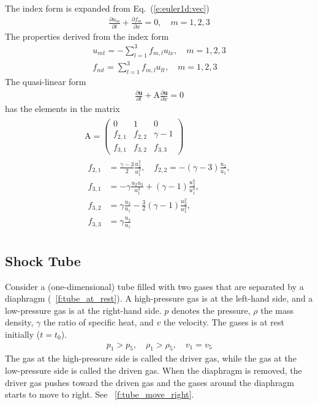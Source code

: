 \documentclass{turgon}
\begin{document}
The index form is expanded from Eq.~(\ref{e:euler1d:vec})
%
\begin{align}
  \frac{\partial u_m}{\partial t} + \frac{\partial f_m}{\partial x}
  = 0, \quad m = 1, 2, 3
  \label{e:euler1:idx}
\end{align}
%
The properties derived from the index form
%
\begin{gather}
  u_{mt} = -\sum_{l=1}^3 f_{m,l} u_{lx},  \quad m = 1, 2, 3
  \label{e:euler1:ut}
  \\
  f_{mt} = \sum_{l=1}^3 f_{m,l} u_{lt},  \quad m = 1, 2, 3
  \label{e:euler1:ft}
\end{gather}
%
The quasi-linear form
%
\begin{align}
  \frac{\partial\mathbf{u}}{\partial t}
  + \mathrm{A} \frac{\partial\mathbf{u}}{\partial x} = 0
  \label{e:euler1d:qlinear}
\end{align}
%
has the elements in the matrix
%
\begin{gather}
  \begin{gathered}
    \mathrm{A} = \left(
    \begin{array}{ccc}
      0       & 1       & 0          \\
      f_{2,1} & f_{2,2} & \gamma - 1 \\
      f_{3,1} & f_{3,2} & f_{3,3}
    \end{array}
    \right)
    \\
    \begin{aligned}
      f_{2,1} &= \frac{\gamma-3}{2}\frac{u_2^2}{u_1^2}, \quad
      f_{2,2} = -(\gamma-3)\frac{u_2}{u_1}, \\
      f_{3,1} &= -\gamma\frac{u_2 u_3}{u_1^2}
      + (\gamma-1)\frac{u_2^3}{u_1^3}, \\
      f_{3,2} &= \gamma\frac{u_3}{u_1}
      - \frac{3}{2}(\gamma-1)\frac{u_2^2}{u_1^2}, \\
      f_{3,3} &= \gamma\frac{u_2}{u_1}
    \end{aligned}
  \end{gathered}
  \label{e:euler1d:jaco}
\end{gather}

\subsection{Shock Tube}

Consider a (one-dimensional) tube filled with two gases that are separated by a
diaphragm (\figurename~\ref{f:tube_at_rest}).
A high-pressure gas is at the left-hand side, and a low-pressure gas is at
the right-hand side.
$p$ denotes the pressure, $\rho$ the mass density, $\gamma$ the ratio of
specific heat, and $v$ the velocity.
The gases is at rest initially ($t = t_0$).
%
\begin{align}
  p_1 > p_5 , \quad
  \rho_1 > \rho_5, \quad
  v_1 = v_5
\end{align}
%
The gas at the high-pressure side is called the driver gas, while the gas at
the low-pressure side is called the driven gas.
When the diaphragm is removed, the driver gas pushes toward the driven gas
and the gases around the diaphragm starts to move to right.
See \figurename~\ref{f:tube_move_right}.
\end{document}
